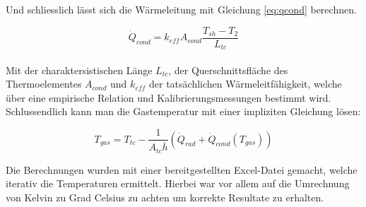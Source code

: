 Und schliesslich lässt sich die Wärmeleitung mit Gleichung \ref{eq:qcond} berechnen.

\begin{equation}
\dot Q_{cond}=k_{eff} A_{cond} \frac{T_{sh}-T_{2}}{L_{tc}}
\label{eq:qcond}
\end{equation}\\

Mit der charaktersistischen Länge $L_{tc}$, der Querschnittsfläche des Thermoelementes $A_{cond}$ und $k_{eff}$ der tatsächlichen Wärmeleitfähigkeit, welche über eine empirische Relation und Kalibrierungsmessungen bestimmt wird.\\

Schlussendlich kann man die Gastemperatur mit einer impliziten Gleichung lösen:

\begin{equation}
T_{gas}=T_{tc}-\frac{1}{A_{tc} \overline h} (\dot Q_{rad} + \dot Q_{cond}(T_{gas}))
\label{eq:tgas}
\end{equation}

Die Berechnungen wurden mit einer bereitgestellten Excel-Datei gemacht, welche iterativ die Temperaturen ermittelt. Hierbei war vor allem auf die Umrechnung von Kelvin zu Grad Celsius zu achten um korrekte Resultate zu erhalten.